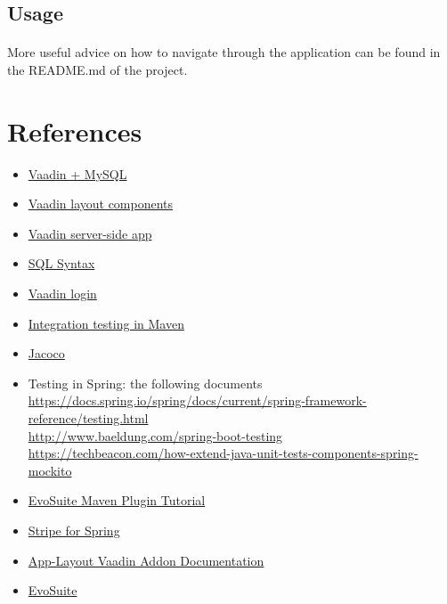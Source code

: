 \documentclass{article}
\begin{document}
		\subsection{Usage}
		\paragraph{} More useful advice on how to navigate through the application can be found in the README.md of the project.

\newpage
	\section{References}
\begin{itemize}
\item{}\href{https://vaadin.com/blog/building-a-web-ui-for-mysql-databases-in-plain-java-?utm_campaign=New%20registration&utm_source=hs_automation&utm_medium=email&utm_content=39610603&_hsenc=p2ANqtz--ut22Rfm32KlobpIHtq6LpH3COcrPL4sZEWDAXO1ZoRH34i0P46KUYGkVxwFIw49_cBYJPSgFVZ82j3sQ5lAAvDc8h-g&_hsmi=39610603}{Vaadin + MySQL}
\item{}\href{https://vaadin.com/docs/v8/framework/layout/layout-overview.html}{Vaadin layout components}
\item{}\href{https://vaadin.com/docs/v8/framework/application/application-overview.html}{Vaadin server-side app}
\item{}\href{https://www.w3schools.com/sql/default.asp}{SQL Syntax}
\item{}\href{https://examples.javacodegeeks.com/enterprise-java/vaadin/vaadin-login-example/}{Vaadin login}
\item{}\href{https://www.petrikainulainen.net/programming/maven/integration-testing-with-maven/}{Integration testing in Maven}
\item{}\href{https://www.petrikainulainen.net/programming/maven/creating-code-coverage-reports-for-unit-and-integration-tests-with-the-jacoco-maven-plugin/}{Jacoco}
\item{}Testing in Spring: the following documents
\\ 	\href{https://docs.spring.io/spring/docs/current/spring-framework-reference/testing.html}{https://docs.spring.io/spring/docs/current/spring-framework-reference/testing.html}
\\ 	\href{http://www.baeldung.com/spring-boot-testing}{http://www.baeldung.com/spring-boot-testing}
\\ 	\href{https://techbeacon.com/how-extend-java-unit-tests-components-spring-mockito}{https://techbeacon.com/how-extend-java-unit-tests-components-spring-mockito}
\item{}\href{http://www.evosuite.org/documentation/maven-plugin/}{EvoSuite Maven Plugin Tutorial}
\item{}\href{http://www.baeldung.com/java-stripe-api}{Stripe for Spring}
\item{}\href{https://vaadin.com/directory/component/app-layout-add-on}{App-Layout Vaadin Addon Documentation}
\item{}\href{http://www.evosuite.org/}{EvoSuite}
\end{itemize}			
\newpage
\end{document}
